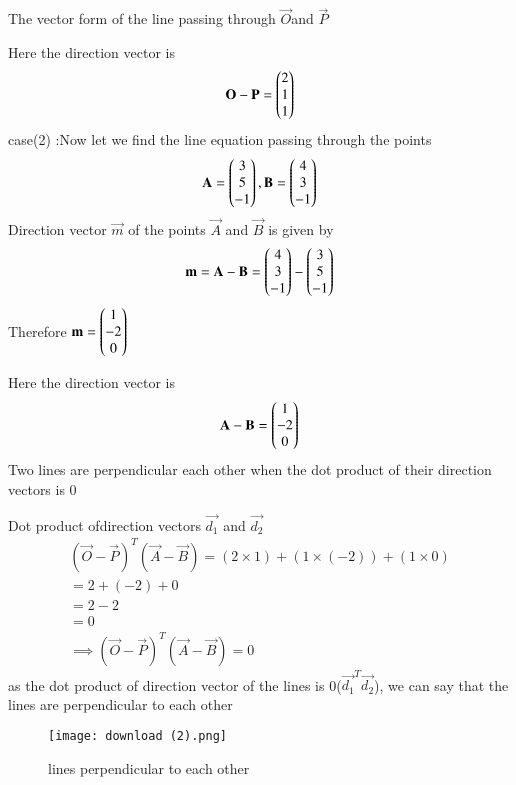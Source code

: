 \documentclass[journal,12pt,twocolumn]{IEEEtran}
\begin{document}
The vector form of the line passing through $\vec{O} $and $\vec{P}$

Here the direction vector is 
\begin{align}
\mathbf{O}-\mathbf{P}=\begin{pmatrix}2\\1\\1\end{pmatrix}
\end{align}
case(2) :Now let we find the line equation passing through the points
\begin{align}
\mathbf{A}=\begin{pmatrix}3\\5\\-1\end{pmatrix} , \mathbf{B}=\begin{pmatrix}4\\3\\-1\end{pmatrix}
\end{align}
Direction vector $\vec{m}$ of the points $\vec{A}$ and $\vec{B}$ is given by 
\begin{align}
\mathbf{m}=\mathbf{A}-\mathbf{B}
=\begin{pmatrix}4\\3\\-1\end{pmatrix}-\begin{pmatrix}3\\5\\-1\end{pmatrix}
\end{align}
Therefore $\mathbf{m}=\begin{pmatrix}1\\-2\\0\end{pmatrix}$

 Here the direction vector is 
\begin{align}
\mathbf{A}-\mathbf{B}=\begin{pmatrix}1\\-2\\0\end{pmatrix}
\end{align}
Two lines are perpendicular each other when the dot product of their direction vectors is 0

Dot product ofdirection vectors  $\vec{d_1}$ and $\vec{d_2}$
\begin{align}
(\vec{O}-\vec{P})^T(\vec{A}-\vec{B})=(2 \times 1) +(1 \times (-2)) +(1 \times 0) 
\\
=2+(-2) +0
\\
=2-2
\\
=0
\\
\implies \boxed{(\vec{O}-\vec{P})^T(\vec{A}-\vec{B})=0}
\end{align}
as the dot product of direction vector of the lines is 0($\vec{d_1}^T\vec{d_2}$), we can say that the lines are perpendicular to each other
\begin{figure}[ht]
\centering
\texttt{[image: download (2).png]}
\caption{lines perpendicular to each other}
\label{Plot of the line}
\end{figure}
\end{document}
